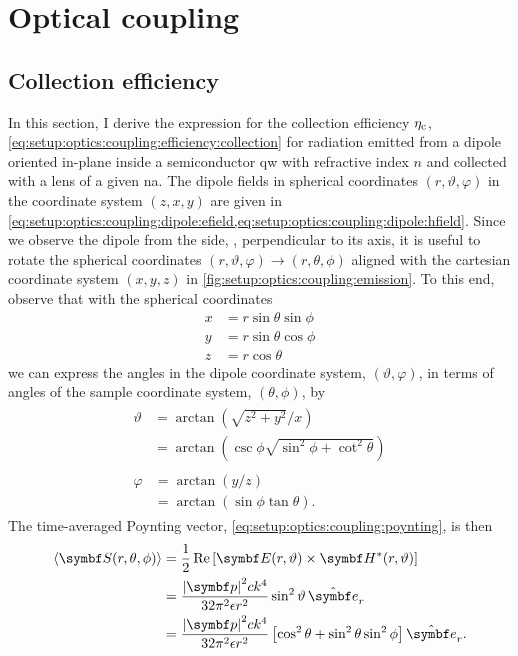 \chapter{Optical coupling}\label{ch:app:setup:optics}
\section{Collection efficiency}\label{sec:app:setup:optics:collection}
In this section, I derive the expression for the collection efficiency $\eta_{\mathrm{c}}$, \cref{eq:setup:optics:coupling:efficiency:collection} for radiation emitted from a dipole oriented in-plane inside a semiconductor \gls{qw} with refractive index $n$ and collected with a lens of a given \gls{na}.
The dipole fields in spherical coordinates $(r, \vartheta, \varphi)$ in the coordinate system $(z, x, y)$ are given in \cref{eq:setup:optics:coupling:dipole:efield,eq:setup:optics:coupling:dipole:hfield}.
Since we observe the dipole from the side, \ie, perpendicular to its axis, it is useful to rotate the spherical coordinates $(r, \vartheta, \varphi) \to (r, \theta, \phi)$ aligned with the cartesian coordinate system $(x, y, z)$ in \cref{fig:setup:optics:coupling:emission}.
To this end, observe that with the spherical coordinates
\begin{align}
    x &= r\sin\theta\sin\phi \\
    y &= r\sin\theta\cos\phi \\
    z &= r\cos\theta
\end{align}
we can express the angles in the dipole coordinate system, $(\vartheta, \varphi)$, in terms of angles of the sample coordinate system, $(\theta, \phi)$, by
\begin{align}
    \begin{split}\label{eq:app:setup:optics:collection:vartheta}
        \vartheta &= \arctan(\sqrt{z^2 + y^2}/x) \\
                  &= \arctan(\csc\phi\sqrt{\sin^2\phi + \cot^2\theta})
    \end{split} \\
    \begin{split}\label{eq:app:setup:optics:collection:varphi}
        \varphi &= \arctan(y/z) \\
                &= \arctan(\sin\phi\tan\theta).
    \end{split}
\end{align}
The time-averaged Poynting vector, \cref{eq:setup:optics:coupling:poynting}, is then
\begin{equation}
    \begin{split}
        \expval{\bvec{S}(r, \theta, \phi)} &= \frac{1}{2}\re\left[\bvec{E}(r, \vartheta)\times\bvec{H}^{\ast}(r, \vartheta)\right] \\
                                           &= \frac{\abs{\bvec{p}}^2 c k^4}{32\pi^2\epsilon r^2}\sin^2\vartheta \,\ubvec{r} \\
                                           &= \frac{\abs{\bvec{p}}^2 c k^4}{32\pi^2\epsilon r^2}\left[\cos^2\theta + \sin^2\theta\sin^2\phi\right] \ubvec{r}.
    \end{split}
\end{equation}
